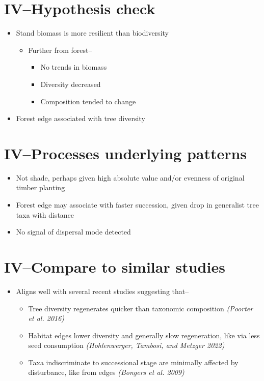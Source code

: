 \documentclass[
]{article}
\begin{document}
\hypertarget{ivhypothesis-check}{%
\section{IV--Hypothesis check}\label{ivhypothesis-check}}

\begin{itemize}
\item
  Stand biomass is more resilient than biodiversity

  \begin{itemize}
  \item
    Further from forest--

    \begin{itemize}
    \item
      No trends in biomass
    \item
      Diversity decreased
    \item
      Composition tended to change
    \end{itemize}
  \end{itemize}
\item
  Forest edge associated with tree diversity
\end{itemize}

\hypertarget{ivprocesses-underlying-patterns}{%
\section{IV--Processes underlying
patterns}\label{ivprocesses-underlying-patterns}}

\begin{itemize}
\item
  Not shade, perhaps given high absolute value and/or evenness of
  original timber planting
\item
  Forest edge may associate with faster succession, given drop in
  generalist tree taxa with distance
\item
  No signal of dispersal mode detected
\end{itemize}

\hypertarget{ivcompare-to-similar-studies}{%
\section{IV--Compare to similar
studies}\label{ivcompare-to-similar-studies}}

\begin{itemize}
\item
  Aligns well with several recent studies suggesting that--

  \begin{itemize}
  \item
    Tree diversity regenerates quicker than taxonomic composition
    \emph{(Poorter et al. 2016)}
  \item
    Habitat edges lower diversity and generally slow regeneration, like
    via less seed consumption \emph{(Hohlenwerger, Tambosi, and Metzger
    2022)}
  \item
    Taxa indiscriminate to successional stage are minimally affected by
    disturbance, like from edges \emph{(Bongers et al. 2009)}
  \end{itemize}
\end{itemize}
\end{document}
